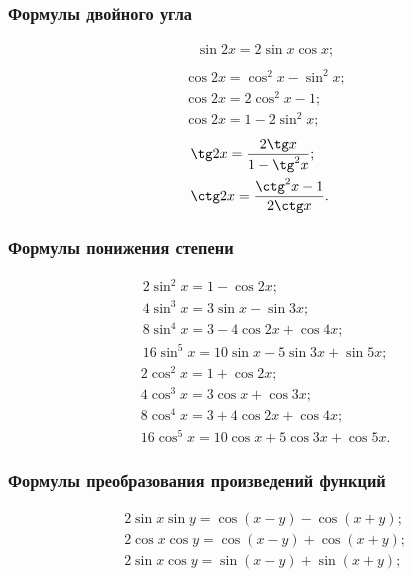 \subsubsection{Формулы двойного угла}
\vspace*{-1.8\baselineskip}
\begin{multicols}{3}
\begin{align*}
&\sin 2x = 2\sin x \cos x;\\ 
\end{align*}
\vfill
\columnbreak
\begin{align*}
&\cos 2x = \cos^2 x - \sin^2 x;\\
&\cos 2x = 2\cos^2 x - 1; \\
&\cos 2x = 1 - 2\sin^2 x;
\end{align*}
\vfill
\columnbreak
\begin{align*}
&\tg 2x = \frac{2\tg x}{1-\tg^2x};\\
&\ctg 2x = \frac{\ctg^2x-1}{2\ctg x}.
\end{align*}
\end{multicols}
\subsubsection{Формулы понижения степени}
\vspace*{-1.8\baselineskip}
\begin{multicols}{2}
\begin{align*}
&2\sin^2x=1-\cos 2x;\\
&4\sin^3x=3\sin x-\sin 3x;\\
&8\sin^4x=3-4\cos2x+\cos4x;\\
&16\sin^5x=10\sin x-5\sin 3x +\sin 5x;
\end{align*}
\vfill
\columnbreak
\begin{align*}
&2\cos^2x=1+\cos 2x;\\
&4\cos^3x=3\cos x+\cos 3x;\\
&8\cos^4x=3+4\cos2x+\cos4x;\\
&16\cos^5x=10\cos x+5\cos 3x +\cos 5x.
\end{align*}
\end{multicols}
\subsubsection{Формулы преобразования произведений функций}
\vspace*{-0.8\baselineskip}
\begin{align*}
&2\sin x \sin y = \cos (x-y)-\cos(x+y);\\
&2\cos x \cos y = \cos (x-y)+\cos(x+y);\\
&2\sin x \cos y = \sin (x-y)+\sin(x+y);
\end{align*}
\newpage
